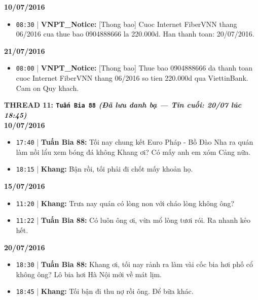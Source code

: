 \documentclass[12pt,a4paper]{article}
\begin{document}
\textbf{10/07/2016}

\begin{itemize}[leftmargin=*, itemsep=2pt, topsep=2pt, parsep=0pt]
  \item \texttt{08:30} | \textbf{VNPT\_Notice:} [Thong bao] Cuoc Internet FiberVNN thang 06/2016 cua thue bao 0904888666 la 220.000d. Han thanh toan: 20/07/2016.

\end{itemize}
\textbf{21/07/2016}

\begin{itemize}[leftmargin=*, itemsep=2pt, topsep=2pt, parsep=0pt]
  \item \texttt{08:00} | \textbf{VNPT\_Notice:} [Thong bao] Thue bao 0904888666 da thanh toan cuoc Internet FiberVNN thang 06/2016 so tien 220.000d qua ViettinBank. Cam on Quy khach.


\end{itemize}

\vspace{0.3cm}\noindent\textbf{\large  THREAD 11: \texttt{Tuấn Bia 88} \textit{(Đã lưu danh bạ — Tin cuối: 20/07 lúc 18:45)}}\\[0.15cm]


\textbf{10/07/2016}

\begin{itemize}[leftmargin=*, itemsep=2pt, topsep=2pt, parsep=0pt]
  \item \texttt{17:40} | \textbf{Tuấn Bia 88:} Tối nay chung kết Euro Pháp - Bồ Đào Nha ra quán làm nồi lẩu xem bóng đá không Khang ơi? Có mấy anh em xóm Cảng nữa.
  \item \texttt{18:15} | \textbf{Khang:} Bận rồi, tối phải đi chốt mấy khoản họ.

\end{itemize}
\textbf{15/07/2016}

\begin{itemize}[leftmargin=*, itemsep=2pt, topsep=2pt, parsep=0pt]
  \item \texttt{11:20} | \textbf{Khang:} Trưa nay quán có lòng non với cháo lòng không ông?
  \item \texttt{11:22} | \textbf{Tuấn Bia 88:} Có luôn ông ơi, vừa mổ lòng tươi rói. Ra nhanh kẻo hết.

\end{itemize}
\textbf{20/07/2016}

\begin{itemize}[leftmargin=*, itemsep=2pt, topsep=2pt, parsep=0pt]
  \item \texttt{18:30} | \textbf{Tuấn Bia 88:} Khang ơi, tối nay rảnh ra làm vài cốc bia hơi phố cổ không ông? Lô bia hơi Hà Nội mới về mát lịm.
  \item \texttt{18:45} | \textbf{Khang:} Tối bận đi thu nợ rồi ông. Để bữa khác.


\end{itemize}
\end{document}
